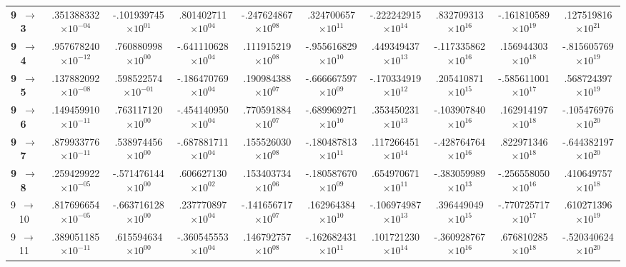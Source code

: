 \documentclass[reviewcopy]{elsarticle}
\begin{document}
\begin{landscape}
\begin{longtable}{lccccccccc}
{\bf 9~$\to$~ 3}  &  .351388332$\times10^{-04}$ &  -.101939745$\times10^{ 01}$ &   .801402711$\times10^{ 04}$ &  -.247624867$\times10^{ 08}$ &   .324700657$\times10^{ 11}$ &  -.222242915$\times10^{ 14}$ &   .832709313$\times10^{ 16}$ &  -.161810589$\times10^{ 19}$ &   .127519816$\times10^{ 21}$ \\
{\bf 9~$\to$~ 4}  &  .957678240$\times10^{-12}$ &   .760880998$\times10^{ 00}$ &  -.641110628$\times10^{ 04}$ &   .111915219$\times10^{ 08}$ &  -.955616829$\times10^{ 10}$ &   .449349437$\times10^{ 13}$ &  -.117335862$\times10^{ 16}$ &   .156944303$\times10^{ 18}$ &  -.815605769$\times10^{ 19}$ \\
{\bf 9~$\to$~ 5}  &  .137882092$\times10^{-08}$ &   .598522574$\times10^{-01}$ &  -.186470769$\times10^{ 04}$ &   .190984388$\times10^{ 07}$ &  -.666667597$\times10^{ 09}$ &  -.170334919$\times10^{ 12}$ &   .205410871$\times10^{ 15}$ &  -.585611001$\times10^{ 17}$ &   .568724397$\times10^{ 19}$ \\
{\bf 9~$\to$~ 6}  &  .149459910$\times10^{-11}$ &   .763117120$\times10^{ 00}$ &  -.454140950$\times10^{ 04}$ &   .770591884$\times10^{ 07}$ &  -.689969271$\times10^{ 10}$ &   .353450231$\times10^{ 13}$ &  -.103907840$\times10^{ 16}$ &   .162914197$\times10^{ 18}$ &  -.105476976$\times10^{ 20}$ \\
{\bf 9~$\to$~ 7}  &  .879933776$\times10^{-11}$ &   .538974456$\times10^{ 00}$ &  -.687881711$\times10^{ 04}$ &   .155526030$\times10^{ 08}$ &  -.180487813$\times10^{ 11}$ &   .117266451$\times10^{ 14}$ &  -.428764764$\times10^{ 16}$ &   .822971346$\times10^{ 18}$ &  -.644382197$\times10^{ 20}$ \\
{\bf 9~$\to$~ 8}  &  .259429922$\times10^{-05}$ &  -.571476144$\times10^{ 00}$ &   .606627130$\times10^{ 02}$ &   .153403734$\times10^{ 06}$ &  -.180587670$\times10^{ 09}$ &   .654970671$\times10^{ 11}$ &  -.383059989$\times10^{ 13}$ &  -.256558050$\times10^{ 16}$ &   .410649757$\times10^{ 18}$ \\
 9~$\to$~ 10 &  .817696654$\times10^{-05}$ &  -.663716128$\times10^{ 00}$ &   .237770897$\times10^{ 04}$ &  -.141656717$\times10^{ 07}$ &   .162964384$\times10^{ 10}$ &  -.106974987$\times10^{ 13}$ &   .396449049$\times10^{ 15}$ &  -.770725717$\times10^{ 17}$ &   .610271396$\times10^{ 19}$ \\
 9~$\to$~ 11 &  .389051185$\times10^{-11}$ &   .615594634$\times10^{ 00}$ &  -.360545553$\times10^{ 04}$ &   .146792757$\times10^{ 08}$ &  -.162682431$\times10^{ 11}$ &   .101721230$\times10^{ 14}$ &  -.360928767$\times10^{ 16}$ &   .676810285$\times10^{ 18}$ &  -.520340624$\times10^{ 20}$ \\

\end{longtable}
\end{landscape}
\end{document}
